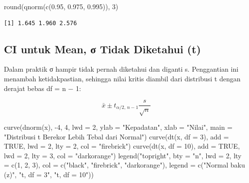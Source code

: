 \documentclass[
  indonesian,
  letterpaper,
]{book}
\newenvironment{Shaded}{\begin{snugshade}}{\end{snugshade}}
\newcommand{\AttributeTok}[1]{\textcolor[rgb]{0.40,0.45,0.13}{#1}}
\newcommand{\ConstantTok}[1]{\textcolor[rgb]{0.56,0.35,0.01}{#1}}
\newcommand{\DecValTok}[1]{\textcolor[rgb]{0.68,0.00,0.00}{#1}}
\newcommand{\FloatTok}[1]{\textcolor[rgb]{0.68,0.00,0.00}{#1}}
\newcommand{\FunctionTok}[1]{\textcolor[rgb]{0.28,0.35,0.67}{#1}}
\newcommand{\NormalTok}[1]{\textcolor[rgb]{0.00,0.23,0.31}{#1}}
\newcommand{\SpecialCharTok}[1]{\textcolor[rgb]{0.37,0.37,0.37}{#1}}
\newcommand{\StringTok}[1]{\textcolor[rgb]{0.13,0.47,0.30}{#1}}
\begin{document}
\begin{Shaded}
\begin{Highlighting}[]
\FunctionTok{round}\NormalTok{(}\FunctionTok{qnorm}\NormalTok{(}\FunctionTok{c}\NormalTok{(}\FloatTok{0.95}\NormalTok{, }\FloatTok{0.975}\NormalTok{, }\FloatTok{0.995}\NormalTok{)), }\DecValTok{3}\NormalTok{)}
\end{Highlighting}
\end{Shaded}

\begin{verbatim}
[1] 1.645 1.960 2.576
\end{verbatim}

\subsection{CI untuk Mean, σ Tidak Diketahui
(t)}\label{ci-untuk-mean-ux3c3-tidak-diketahui-t}

Dalam praktik σ hampir tidak pernah diketahui dan diganti s. Penggantian
ini menambah ketidakpastian, sehingga nilai kritis diambil dari
distribusi t dengan derajat bebas df = n − 1:

\[\bar{x} \pm t_{\alpha/2,\,n-1} \dfrac{s}{\sqrt{n}}\]

\begin{Shaded}
\begin{Highlighting}[]
\FunctionTok{curve}\NormalTok{(}\FunctionTok{dnorm}\NormalTok{(x), }\SpecialCharTok{{-}}\DecValTok{4}\NormalTok{, }\DecValTok{4}\NormalTok{, }\AttributeTok{lwd =} \DecValTok{2}\NormalTok{, }\AttributeTok{ylab =} \StringTok{"Kepadatan"}\NormalTok{, }\AttributeTok{xlab =} \StringTok{"Nilai"}\NormalTok{,}
\AttributeTok{main =} \StringTok{"Distribusi t Berekor Lebih Tebal dari Normal"}\NormalTok{)}
\FunctionTok{curve}\NormalTok{(}\FunctionTok{dt}\NormalTok{(x, }\AttributeTok{df =} \DecValTok{3}\NormalTok{), }\AttributeTok{add =} \ConstantTok{TRUE}\NormalTok{, }\AttributeTok{lwd =} \DecValTok{2}\NormalTok{, }\AttributeTok{lty =} \DecValTok{2}\NormalTok{, }\AttributeTok{col =} \StringTok{"firebrick"}\NormalTok{)}
\FunctionTok{curve}\NormalTok{(}\FunctionTok{dt}\NormalTok{(x, }\AttributeTok{df =} \DecValTok{10}\NormalTok{), }\AttributeTok{add =} \ConstantTok{TRUE}\NormalTok{, }\AttributeTok{lwd =} \DecValTok{2}\NormalTok{, }\AttributeTok{lty =} \DecValTok{3}\NormalTok{, }\AttributeTok{col =} \StringTok{"darkorange"}\NormalTok{)}
\FunctionTok{legend}\NormalTok{(}\StringTok{"topright"}\NormalTok{, }\AttributeTok{bty =} \StringTok{"n"}\NormalTok{, }\AttributeTok{lwd =} \DecValTok{2}\NormalTok{, }\AttributeTok{lty =} \FunctionTok{c}\NormalTok{(}\DecValTok{1}\NormalTok{, }\DecValTok{2}\NormalTok{, }\DecValTok{3}\NormalTok{), }\AttributeTok{col =} \FunctionTok{c}\NormalTok{(}\StringTok{"black"}\NormalTok{, }\StringTok{"firebrick"}\NormalTok{, }\StringTok{"darkorange"}\NormalTok{),}
\AttributeTok{legend =} \FunctionTok{c}\NormalTok{(}\StringTok{"Normal baku (z)"}\NormalTok{, }\StringTok{"t, df = 3"}\NormalTok{, }\StringTok{"t, df = 10"}\NormalTok{))}
\end{Highlighting}
\end{Shaded}
\end{document}
